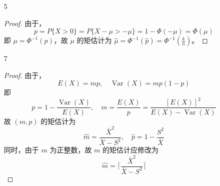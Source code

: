 \documentclass[normal,founder,mtpro2,cn]{elegantnote}
\begin{document}
\begin{enumerate}
\begin{proof}
\begin{enumerate}
\begin{equation*}
                          \theta=\sqrt{\operatorname{Var}(X)},\quad\mu=E(X)-\sqrt{\operatorname{Var}(X)}
                      \end{equation*}
                      故 $(\theta,\mu)$ 的矩估计为
                      \begin{equation*}
                          \hat{\theta}=\sqrt{S^2},\quad\hat{\mu}=\bar{X}-\sqrt{S^2}
                      \end{equation*}
            \end{enumerate}
        \end{proof}
    \item[5]
        \begin{proof}
            由于，
            \begin{equation*}
                p=P\{X>0\}=P\{X-\mu>-\mu\}=1-\Phi(-\mu)=\Phi(\mu)
            \end{equation*}
            即 $\mu=\Phi^{-1}(p)$，故 $\mu$ 的矩估计为 $\hat{\mu}=\Phi^{-1}(\hat{p})=\Phi^{-1}\left(\frac{k}{n}\right)$。
        \end{proof}
    \item[7]
        \begin{proof}
            由于，
            \begin{equation*}
                E(X)=mp,\quad\operatorname{Var}(X)=mp(1-p)
            \end{equation*}
            即
            \begin{equation*}
                p=1-\frac{\operatorname{Var}(X)}{E(X)},\quad m=\frac{E(X)}{p}=\frac{[E(X)]^{2}}{E(X)-\operatorname{Var}(X)}
            \end{equation*}
            故 $(m,p)$ 的矩估计为
            \begin{equation*}
                \hat{m}=\frac{\bar{X}^{2}}{\bar{X}-S^{2}},\quad\hat{p}=1-\frac{S^{2}}{\bar{X}}
            \end{equation*}
            同时，由于 $m$ 为正整数，故 $m$ 的矩估计应修改为
            \begin{equation*}
                \hat{m}=\lceil\frac{\bar{X}^{2}}{\bar{X}-S^{2}}\rceil
            \end{equation*}
        \end{proof}
\end{enumerate}
\end{document}
